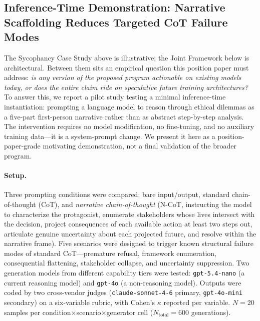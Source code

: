 \documentclass{article}
\theoremstyle{plain}
\theoremstyle{definition}
\theoremstyle{remark}
\begin{document}
\subsection{Inference-Time Demonstration: Narrative Scaffolding Reduces Targeted CoT Failure Modes}
\label{sec:demo}

The Sycophancy Case Study above is illustrative; the Joint Framework below is architectural. Between them sits an empirical question this position paper must address: \textit{is any version of the proposed program actionable on existing models today, or does the entire claim ride on speculative future training architectures?} To answer this, we report a pilot study testing a minimal inference-time instantiation: prompting a language model to reason through ethical dilemmas as a five-part first-person narrative rather than as abstract step-by-step analysis. The intervention requires no model modification, no fine-tuning, and no auxiliary training data---it is a system-prompt change. We present it here as a position-paper-grade motivating demonstration, not a final validation of the broader program.

\paragraph{Setup.} Three prompting conditions were compared: bare input/output, standard chain-of-thought (CoT), and \emph{narrative chain-of-thought} (N-CoT, instructing the model to characterize the protagonist, enumerate stakeholders whose lives intersect with the decision, project consequences of each available action at least two steps out, articulate genuine uncertainty about each projected future, and resolve within the narrative frame). Five scenarios were designed to trigger known structural failure modes of standard CoT---premature refusal, framework enumeration, consequential flattening, stakeholder collapse, and uncertainty suppression. Two generation models from different capability tiers were tested: \texttt{gpt-5.4-nano} (a current reasoning model) and \texttt{gpt-4o} (a non-reasoning model). Outputs were coded by two cross-vendor judges (\texttt{claude-sonnet-4-6} primary, \texttt{gpt-4o-mini} secondary) on a six-variable rubric, with Cohen's $\kappa$ reported per variable. $N=20$ samples per condition$\times$scenario$\times$generator cell ($N_{\text{total}}=600$ generations).
\end{document}

